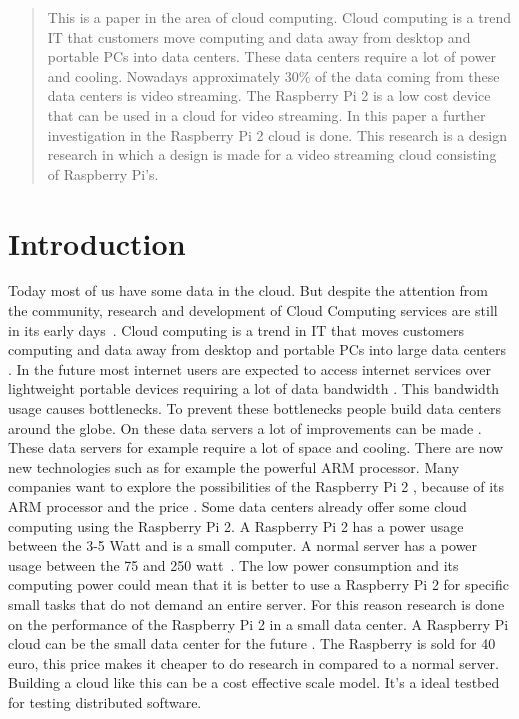 \documentclass{sig-alternate-br}
\begin{document}
\maketitle
\begin{abstract}
This is a paper in the area of cloud computing. Cloud computing is a trend IT that customers move computing and data away from desktop and portable PCs into data centers. These data centers require a lot of power and cooling. Nowadays approximately 30\% of the data coming from these data centers is video streaming. The Raspberry Pi 2 is a low cost device that can be used in a cloud for video streaming. In this paper a further investigation in the Raspberry Pi 2 cloud is done. This research is a design research in which a design is made for a video streaming cloud consisting of Raspberry Pi's. 
\end{abstract}


\section{Introduction}
Today most of us have some data in the cloud. But despite the attention from the community, research and development of Cloud Computing services are still in its early days~\citep{tso:2013}. \newline
Cloud computing is a trend in IT that moves customers computing and data away from desktop and portable PCs into large data centers \citep{dikaiakos:2009}. In the future most internet users are expected to access internet services over lightweight portable devices requiring a lot of data bandwidth \cite{dikaiakos:2009}. This bandwidth usage causes bottlenecks. To prevent these bottlenecks people build data centers around the globe. On these data servers a lot of improvements can be made \cite{abrahamsson:2013,beloglazov:2010}. 
These data servers for example require a lot of space and cooling. There are now new technologies such as for example the powerful ARM processor. Many companies want to explore the possibilities of the Raspberry Pi 2 , because of its ARM processor and the price \cite{Pcextreme}. Some data centers already offer some cloud computing using the Raspberry Pi 2. \newline
A Raspberry Pi 2 has a power usage between the 3-5 Watt and is a small computer. A normal server has a power usage between the 75 and 250 watt~\cite{Pcextreme,beloglazov2012energy}. The low power consumption and its computing power could mean that it is better to use a Raspberry Pi 2 for specific small tasks that do not demand an entire server. For this reason research is done on the performance of the Raspberry Pi 2 in a small data center. \newline
A Raspberry Pi cloud can be the small data center for the future \cite{tso:2013}. The Raspberry is sold for 40 euro, this price makes it cheaper to do research in compared to a normal server. Building a cloud like this can be a cost effective scale model\cite{tso:2013}. It's a ideal testbed for testing distributed software. 
\end{document}
